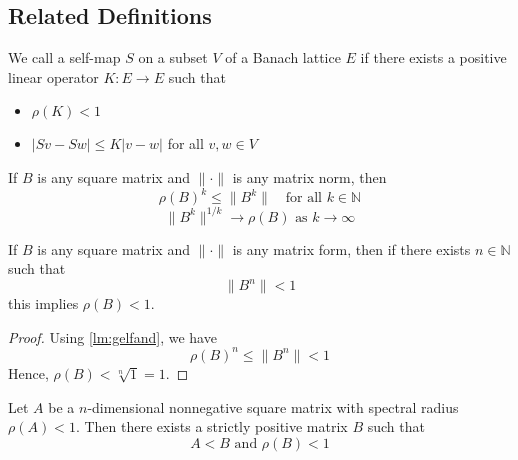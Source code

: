 \subsection{Related Definitions}
\begin{definition}
We call a self-map $S$ on a subset $V$ of a Banach lattice $E$ if there exists a positive linear operator $K:E \to E$ such that
\begin{itemize}
    \item $\rho(K)<1$ 
    \item $|Sv-Sw|\le K|v-w|$  for all $v,w\in V$
\end{itemize}

\end{definition}
\begin{lemma}\label{lm:gelfand}
    If $B$ is any square matrix and $\|\cdot\|$ is any matrix norm, then
    $$
    \rho(B)^k\le \|B^k\|\quad \text{for all $k\in\mathbb{N}$}
    $$
    $$
    \|B^k\|^{1/k}\to \rho(B)\text{ as $k\to\infty$}
    $$
\end{lemma}
\begin{corollary}\label{col:gelfand col}
    If $B$ is any square matrix and $\|\cdot\|$ is any matrix form, then if there exists $n\in\mathbb{N}$ such that 
    $$
    \|B^n\|<1
    $$
    this implies $\rho(B)<1$.
\end{corollary}
\begin{proof}
    Using \autoref{lm:gelfand}, we have
    $$
    \rho(B)^n \le \|B^n\|<1
    $$
    Hence, $\rho(B)< \sqrt[n]{1}=1$.
\end{proof}
\begin{lemma}
Let $A$ be a $n$-dimensional nonnegative square matrix with spectral radius $\rho(A)<1$. Then there exists a strictly positive matrix $B$ such that 
$$
A< B\text{ and $\rho(B)<1$}
$$
\end{lemma}
